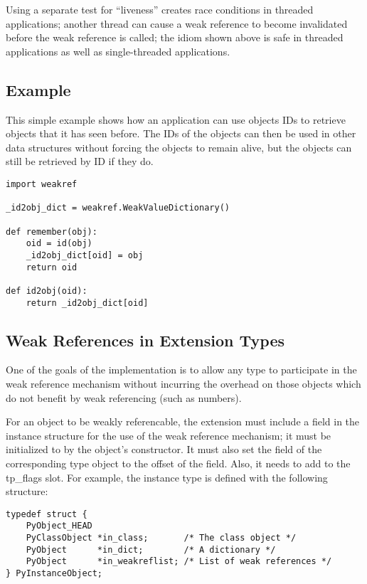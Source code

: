 Using a separate test for ``liveness'' creates race conditions in
threaded applications; another thread can cause a weak reference to
become invalidated before the weak reference is called; the
idiom shown above is safe in threaded applications as well as
single-threaded applications.


\subsection{Example \label{weakref-example}}

This simple example shows how an application can use objects IDs to
retrieve objects that it has seen before.  The IDs of the objects can
then be used in other data structures without forcing the objects to
remain alive, but the objects can still be retrieved by ID if they
do.

\begin{verbatim}
import weakref

_id2obj_dict = weakref.WeakValueDictionary()

def remember(obj):
    oid = id(obj)
    _id2obj_dict[oid] = obj
    return oid

def id2obj(oid):
    return _id2obj_dict[oid]
\end{verbatim}


\subsection{Weak References in Extension Types
            \label{weakref-extension}}

One of the goals of the implementation is to allow any type to
participate in the weak reference mechanism without incurring the
overhead on those objects which do not benefit by weak referencing
(such as numbers).

For an object to be weakly referencable, the extension must include a
 field in the instance structure for the use of the
weak reference mechanism; it must be initialized to \NULL{} by the
object's constructor.  It must also set the 
field of the corresponding type object to the offset of the field.
Also, it needs to add  to the
tp_flags slot.  For example, the instance type is defined with the
following structure:

\begin{verbatim}
typedef struct {
    PyObject_HEAD
    PyClassObject *in_class;       /* The class object */
    PyObject      *in_dict;        /* A dictionary */
    PyObject      *in_weakreflist; /* List of weak references */
} PyInstanceObject;
\end{verbatim}

